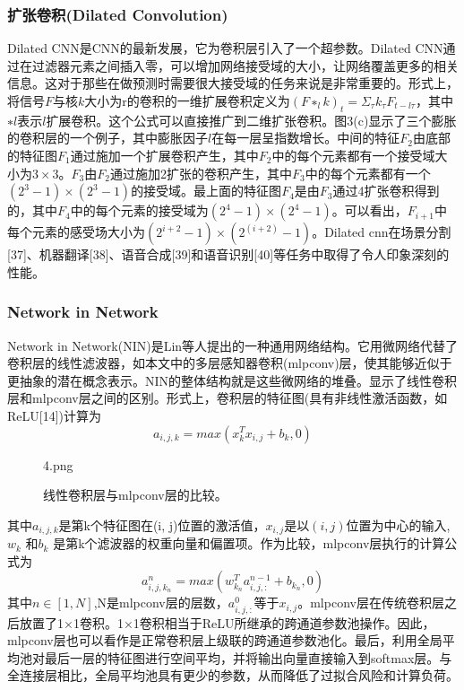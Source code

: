 \documentclass[final]{cvpr}
\begin{document}
\subsubsection{扩张卷积(Dilated Convolution)}
Dilated CNN是CNN的最新发展，它为卷积层引入了一个超参数。Dilated CNN通过在过滤器元素之间插入零，可以增加网络接受域的大小，让网络覆盖更多的相关信息。这对于那些在做预测时需要很大接受域的任务来说是非常重要的。形式上，将信号$F$与核$k$大小为r的卷积的一维扩展卷积定义为$(F ∗_l k)_t=\Sigma_{\tau}k_{\tau}F_{t−l\tau}$，其中$∗l$表示$l$扩展卷积。这个公式可以直接推广到二维扩张卷积。图3(c)显示了三个膨胀的卷积层的一个例子，其中膨胀因子$l$在每一层呈指数增长。中间的特征$F_2$由底部的特征图$F_1$通过施加一个扩展卷积产生，其中$F_2$中的每个元素都有一个接受域大小为$3×3$。$F_3$由$F_2$通过施加2扩张的卷积产生，其中$F_3$中的每个元素都有一个$(2^3−1)×(2^3−1)$的接受域。最上面的特征图$F_4$是由$F_3$通过4扩张卷积得到的，其中$F_4$中的每个元素的接受域为$(2^4−1)×(2^4−1)$。可以看出，$F_{i+1}$中每个元素的感受场大小为$(2^{i+2}−1)×(2^(i+2)−1)$。Dilated cnn在场景分割[37]、机器翻译[38]、语音合成[39]和语音识别[40]等任务中取得了令人印象深刻的性能。
\subsubsection{Network in Network}
Network in Network(NIN)是Lin等人提出的一种通用网络结构。它用微网络代替了卷积层的线性滤波器，如本文中的多层感知器卷积(mlpconv)层，使其能够近似于更抽象的潜在概念表示。NIN的整体结构就是这些微网络的堆叠。显示了线性卷积层和mlpconv层之间的区别。形式上，卷积层的特征图(具有非线性激活函数，如ReLU[14])计算为
\begin{equation}
	a_{i,j,k}=max(x^T_kx_{i,j}+b_k,0)
\end{equation}
\begin{figure}[t!]
	\begin{overpic}[width=\columnwidth]{4.png}
	\end{overpic}
	\caption{线性卷积层与mlpconv层的比较。
	}\label{fig:compar}
\end{figure}
其中$a_{i,j,k}$是第k个特征图在(i, j)位置的激活值，$x_{i,j}$是以$(i, j)$位置为中心的输入, $w_k$ 和$b_k$ 是第k个滤波器的权重向量和偏置项。作为比较，mlpconv层执行的计算公式为
\begin{equation}
	a^n_{i,j,k_n}=max(w^T_{k_n}a^{n-1}_{i,j,:}+b_{k_n},0)
\end{equation}
其中$n\in[1,N]$,N是mlpconv层的层数，$a^0_{i,j,:}$等于$x_{i,j}$。mlpconv层在传统卷积层之后放置了1×1卷积。1×1卷积相当于ReLU所继承的跨通道参数池操作。因此，mlpconv层也可以看作是正常卷积层上级联的跨通道参数池化。最后，利用全局平均池对最后一层的特征图进行空间平均，并将输出向量直接输入到softmax层。与全连接层相比，全局平均池具有更少的参数，从而降低了过拟合风险和计算负荷。
\end{document}
